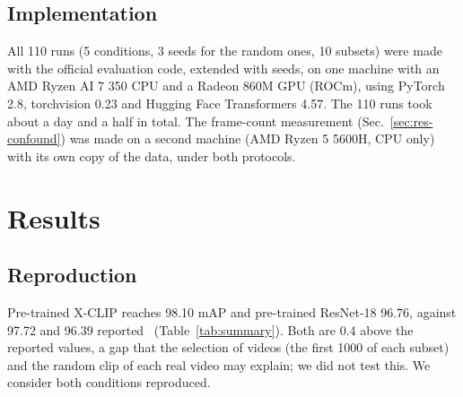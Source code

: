 \documentclass[conference]{IEEEtran}
\begin{document}
\subsection{Implementation}

All 110 runs (5 conditions, 3 seeds for the random ones, 10 subsets) were made
with the official evaluation code, extended with seeds, on one machine with an
AMD Ryzen AI 7 350 CPU and a Radeon 860M GPU (ROCm), using PyTorch 2.8,
torchvision 0.23 and Hugging Face Transformers 4.57. The 110 runs took about
a day and a half in total. The frame-count measurement (Sec.~\ref{sec:res-confound}) was made
on a second machine (AMD Ryzen 5 5600H, CPU only) with its own copy of the
data, under both protocols.
\section{Results}
\label{sec:results}

\subsection{Reproduction}

Pre-trained X-CLIP reaches 98.10 mAP and pre-trained ResNet-18 96.76, against
97.72 and 96.39 reported~\cite{zheng2025d3} (Table~\ref{tab:summary}). Both
are 0.4 above the reported values, a gap that the selection of videos (the
first 1000 of each subset) and the random clip of each real video may
explain; we did not test this. We consider both conditions reproduced.
\end{document}

